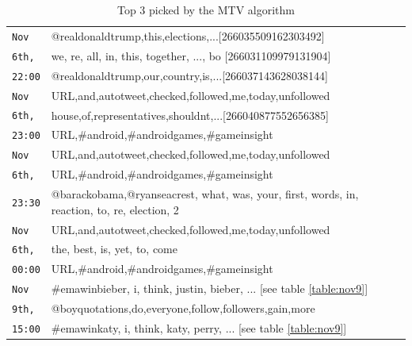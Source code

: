 \documentclass{sig-alternate}
\begin{document}
 
 \begin{table}
 \begin{center}
\small
\def\arraystretch{1.1}
\begin{tabular}{|p{.6cm}|p{7.5cm}|}

\hline

\texttt{Nov}
& @realdonaldtrump,this,elections,...[266035509162303492] \\\cline{2-2} %
\texttt{6th,}
&we, re, all, in, this, together, ..., bo [266031109979131904]  \\\cline{2-2} %
\texttt{22:00} & @realdonaldtrump,our,country,is,...[266037143628038144] \\\hline %




\texttt{Nov}
&URL,and,autotweet,checked,followed,me,today,unfollowed \\\cline{2-2}
\texttt{6th,}
&house,of,representatives,shouldnt,...[266040877552656385]  \\\cline{2-2} %
\texttt{23:00} & URL,\#android,\#androidgames,\#gameinsight \\\hline 


\texttt{Nov}
&URL,and,autotweet,checked,followed,me,today,unfollowed \\\cline{2-2}
\texttt{6th,}
&URL,\#android,\#androidgames,\#gameinsight  \\\cline{2-2} 
\texttt{23:30} &@barackobama,@ryanseacrest, what, was, your, first, words, in, reaction, to, re, election, 2\\\hline 


\texttt{Nov}
&URL,and,autotweet,checked,followed,me,today,unfollowed \\\cline{2-2}
\texttt{6th,}
&the, best, is, yet, to, come \\\cline{2-2} 
\texttt{00:00} & URL,\#android,\#androidgames,\#gameinsight \\\hline 



\texttt{Nov}
& \#emawinbieber, i, think, justin, bieber, ... [see table \ref{table:nov9}] \\\cline{2-2}
\texttt{9th,}
&@boyquotations,do,everyone,follow,followers,gain,more \\\cline{2-2} 
\texttt{15:00} & \#emawinkaty, i, think, katy, perry, ... [see table \ref{table:nov9}] \\\hline 
\end{tabular}
\end{center}
\caption{Top 3 picked by the MTV algorithm}
 \label{table:mtv}
\end{table}
\end{document}
